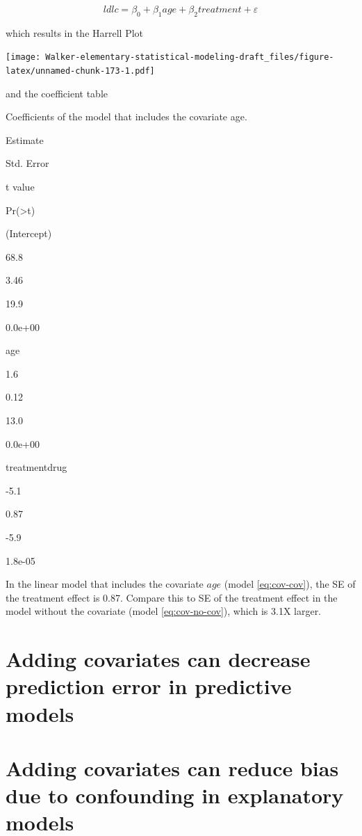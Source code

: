 \documentclass[]{book}
\begin{document}
\begin{equation}
ldlc = \beta_0 + \beta_1 age + \beta_2 treatment + \varepsilon
\label{eq:cov-cov}
\end{equation}

which results in the Harrell Plot

\texttt{[image: Walker-elementary-statistical-modeling-draft\_files/figure-latex/unnamed-chunk-173-1.pdf]}

and the coefficient table

\label{tab:unnamed-chunk-174}Coefficients of the model that includes the covariate age.

Estimate

Std. Error

t value

Pr(\textgreater\textbar t\textbar)

(Intercept)

68.8

3.46

19.9

0.0e+00

age

1.6

0.12

13.0

0.0e+00

treatmentdrug

-5.1

0.87

-5.9

1.8e-05

In the linear model that includes the covariate \(age\) (model \eqref{eq:cov-cov}), the SE of the treatment effect is 0.87. Compare this to SE of the treatment effect in the model without the covariate (model \eqref{eq:cov-no-cov}), which is 3.1X larger.

\hypertarget{adding-covariates-can-decrease-prediction-error-in-predictive-models}{%
\section{Adding covariates can decrease prediction error in predictive models}\label{adding-covariates-can-decrease-prediction-error-in-predictive-models}}

\hypertarget{adding-covariates-can-reduce-bias-due-to-confounding-in-explanatory-models}{%
\section{Adding covariates can reduce bias due to confounding in explanatory models}\label{adding-covariates-can-reduce-bias-due-to-confounding-in-explanatory-models}}
\end{document}
